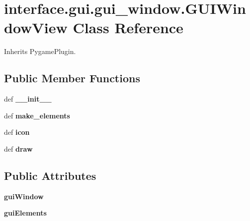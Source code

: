 \hypertarget{classinterface_1_1gui_1_1gui__window_1_1_g_u_i_window_view}{\section{interface.\-gui.\-gui\-\_\-window.\-G\-U\-I\-Window\-View \-Class \-Reference}
\label{classinterface_1_1gui_1_1gui__window_1_1_g_u_i_window_view}
}


\-Inherits \-Pygame\-Plugin.

\subsection*{\-Public \-Member \-Functions}
\begin{DoxyCompactItemize}
\item 
\hypertarget{classinterface_1_1gui_1_1gui__window_1_1_g_u_i_window_view_ad9db12fe17a0e99f6328c50324a01ec6}{def {\bfseries \-\_\-\-\_\-init\-\_\-\-\_\-}}\label{classinterface_1_1gui_1_1gui__window_1_1_g_u_i_window_view_ad9db12fe17a0e99f6328c50324a01ec6}

\item 
\hypertarget{classinterface_1_1gui_1_1gui__window_1_1_g_u_i_window_view_a41963e5e2cc260b3924687e0c98827a2}{def {\bfseries make\-\_\-elements}}\label{classinterface_1_1gui_1_1gui__window_1_1_g_u_i_window_view_a41963e5e2cc260b3924687e0c98827a2}

\item 
\hypertarget{classinterface_1_1gui_1_1gui__window_1_1_g_u_i_window_view_a10abe3a3fa821db87bece33d0489a585}{def {\bfseries icon}}\label{classinterface_1_1gui_1_1gui__window_1_1_g_u_i_window_view_a10abe3a3fa821db87bece33d0489a585}

\item 
\hypertarget{classinterface_1_1gui_1_1gui__window_1_1_g_u_i_window_view_ac022288e7853fdbbf7e1ab4fc573c5c3}{def {\bfseries draw}}\label{classinterface_1_1gui_1_1gui__window_1_1_g_u_i_window_view_ac022288e7853fdbbf7e1ab4fc573c5c3}

\end{DoxyCompactItemize}
\subsection*{\-Public \-Attributes}
\begin{DoxyCompactItemize}
\item 
\hypertarget{classinterface_1_1gui_1_1gui__window_1_1_g_u_i_window_view_a4c2e8f12596777b94db233a5c8c28f0f}{{\bfseries gui\-Window}}\label{classinterface_1_1gui_1_1gui__window_1_1_g_u_i_window_view_a4c2e8f12596777b94db233a5c8c28f0f}

\item 
\hypertarget{classinterface_1_1gui_1_1gui__window_1_1_g_u_i_window_view_a0a3a1843433931f903df372a15eb8172}{{\bfseries gui\-Elements}}\label{classinterface_1_1gui_1_1gui__window_1_1_g_u_i_window_view_a0a3a1843433931f903df372a15eb8172}

\end{DoxyCompactItemize}


